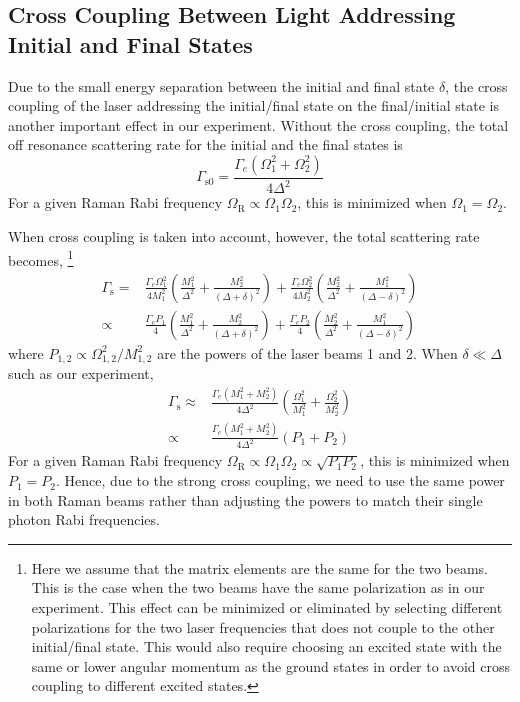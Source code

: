 \subsection{Cross Coupling Between Light Addressing Initial and Final States}
\label{ch:raman-transfer:raman:cross-couple}

Due to the small energy separation between the initial and final state $\delta$,
the cross coupling of the laser addressing the initial/final state on the final/initial state
is another important effect in our experiment.
Without the cross coupling, the total off resonance scattering rate for
the initial and the final states is
\[
  \Gamma_{\mathrm{s}0}=\frac{\Gamma_e\left(\Omega_1^2+\Omega_2^2\right)}{4\Delta^2}
\]
For a given Raman Rabi frequency $\Omega_{\mathrm{R}}\propto\Omega_1\Omega_2$, this is
minimized when $\Omega_1=\Omega_2$.

When cross coupling is taken into account, however, the total scattering rate becomes,
\footnote{Here we assume that the matrix elements are the same for the two beams.
  This is the case when the two beams have the same polarization as in our experiment.
  This effect can be minimized or eliminated by selecting different polarizations for the
  two laser frequencies that does not couple to the other initial/final state.
  This would also require choosing an excited state with the same or lower angular momentum
  as the ground states in order to avoid cross coupling to different excited states.}
\begin{align}
  \Gamma_{\mathrm{s}}=&\frac{\Gamma_e\Omega_1^2}{4M_1^2}\left(\frac{M_1^2}{\Delta^2}+\frac{M_2^2}{(\Delta+\delta)^2}\right)+\frac{\Gamma_e\Omega_2^2}{4M_2^2}\left(\frac{M_2^2}{\Delta^2}+\frac{M_1^2}{(\Delta-\delta)^2}\right)\\
  \propto&\frac{\Gamma_eP_1}{4}\left(\frac{M_1^2}{\Delta^2}+\frac{M_2^2}{(\Delta+\delta)^2}\right)+\frac{\Gamma_eP_2}{4}\left(\frac{M_2^2}{\Delta^2}+\frac{M_1^2}{(\Delta-\delta)^2}\right)
\end{align}
where $P_{1,2}\propto\Omega_{1,2}^2/M_{1,2}^2$ are the powers of the laser beams 1 and 2.
When $\delta\ll\Delta$ such as our experiment,
\begin{align*}
  \Gamma_{\mathrm{s}}\approx&\frac{\Gamma_e\left(M_1^2+M_2^2\right)}{4\Delta^2}\left(\frac{\Omega_1^2}{M_1^2}+\frac{\Omega_2^2}{M_2^2}\right)\\
  \propto&\frac{\Gamma_e\left(M_1^2+M_2^2\right)}{4\Delta^2}\left(P_1+P_2\right)
\end{align*}
For a given Raman Rabi frequency $\Omega_{\mathrm{R}}\propto\Omega_1\Omega_2\propto\sqrt{P_1P_2}$,
this is minimized when $P_1=P_2$.
Hence, due to the strong cross coupling, we need to use the same power in both Raman beams
rather than adjusting the powers to match their single photon Rabi frequencies.

